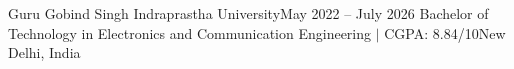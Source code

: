 \resumeSubheading
  {Guru Gobind Singh Indraprastha University}{May 2022 -- July 2026}
  {Bachelor of Technology in Electronics and Communication Engineering $|$ CGPA: 8.84/10}{New Delhi, India}
